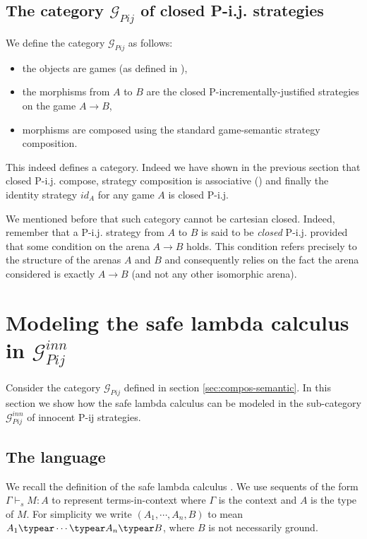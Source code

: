 \subsection{The category $\mathcal{G}_{Pij}$ of closed P-i.j. strategies}

We define the category $\mathcal{G}_{Pij}$ as follows:
\begin{itemize}
\item the objects are games (as defined in \cite{abramsky:game-semantics-tutorial}),
\item the morphisms from $A$ to $B$ are the closed P-incrementally-justified strategies
on the game $A\rightarrow B$,
\item morphisms are composed using the standard game-semantic strategy composition.
\end{itemize}
This indeed defines a category. Indeed we have shown in the previous
section that closed P-i.j. compose, strategy composition is
associative (\cite{abramsky94full,hylandong_pcf}) and finally the
identity strategy $id_A$ for any game $A$ is closed P-i.j.

We mentioned before that such category cannot be cartesian closed. Indeed, remember that
a P-i.j. strategy from $A$ to $B$ is said to be \emph{closed} P-i.j. provided that some condition
on the arena $A\rightarrow B$ holds. This condition refers precisely to the structure of the arenas $A$ and $B$ and consequently relies on the fact the arena considered is exactly $A\rightarrow B$ (and not any other isomorphic arena).



\section{Modeling the safe lambda calculus in $\mathcal{G}_{Pij}^{inn}$}

Consider the category $\mathcal{G}_{Pij}$ defined in section
\ref{sec:compos-semantic}. In this section we show how the safe
lambda calculus can be modeled in the sub-category
$\mathcal{G}_{Pij}^{inn}$ of innocent P-ij strategies.

\subsection{The language}
We recall the definition of the safe lambda calculus
\cite{blumong:safelambdacalculus}.  We use sequents of the form
$\Gamma \vdash_s M : A$ to represent terms-in-context where $\Gamma$
is the context and $A$ is the type of $M$. For simplicity we write
$(A_1, \cdots, A_n, B)$ to mean $A_1 \typear \cdots \typear A_n
\typear B$, where $B$ is not necessarily ground.

